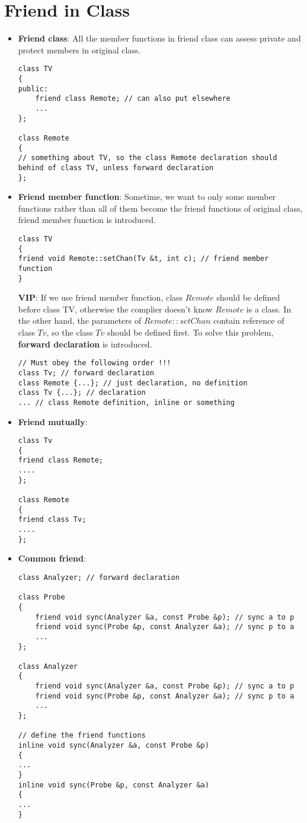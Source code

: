 \documentclass[10pt,a4paper,oneside]{article}
\begin{document}
\section{Friend  in Class}
\begin{itemize}
\item {\bfseries Friend class}: All the member functions in friend class can assess private and protect members in original class.
\begin{lstlisting}
class TV
{
public:
    friend class Remote; // can also put elsewhere
    ...
};

class Remote
{
// something about TV, so the class Remote declaration should behind of class TV, unless forward declaration
};
\end{lstlisting}
\item {\bfseries Friend member function}: Sometime, we want to only some member functions rather than all of them become the friend functions of original class, friend member function is introduced.
\begin{lstlisting}
class TV
{
friend void Remote::setChan(Tv &t, int c); // friend member function
}
\end{lstlisting}
{\bfseries VIP}: If we use friend member function, class $Remote$ should be defined before class TV, otherwise the complier doesn't know $Remote$ is a class. In the other hand, the parameters of $Remote::setChan$ contain reference of class $Tv$, so the class $Tv$ should be defined first. To solve this problem, {\bfseries forward declaration} is introduced.
\begin{lstlisting}
// Must obey the following order !!!
class Tv; // forward declaration
class Remote {...}; // just declaration, no definition
class Tv {...}; // declaration 
... // class Remote definition, inline or something
\end{lstlisting}
\item {\bfseries Friend mutually}:
\begin{lstlisting}
class Tv
{
friend class Remote;
....
};

class Remote
{
friend class Tv;
....
};
\end{lstlisting}
\item {\bfseries Common friend}:
\begin{lstlisting}
class Analyzer; // forward declaration

class Probe
{
    friend void sync(Analyzer &a, const Probe &p); // sync a to p
    friend void sync(Probe &p, const Analyzer &a); // sync p to a
    ...
};

class Analyzer
{
    friend void sync(Analyzer &a, const Probe &p); // sync a to p
    friend void sync(Probe &p, const Analyzer &a); // sync p to a
    ...
};

// define the friend functions
inline void sync(Analyzer &a, const Probe &p)
{
...
}
inline void sync(Probe &p, const Analyzer &a)
{
...
}
\end{lstlisting}
\end{itemize}
\end{document}
